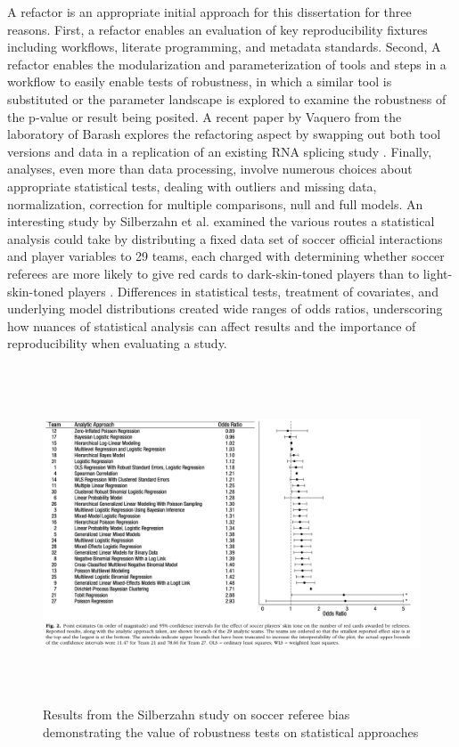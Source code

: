 \documentclass{drexelthesis}
\begin{document}
A refactor is an appropriate initial approach for this dissertation for three reasons. First, a refactor enables an evaluation of key reproducibility fixtures including workflows, literate programming, and metadata standards. Second, A refactor enables the modularization and parameterization of tools and steps in a workflow to easily enable tests of robustness, in which a similar tool is substituted or the parameter landscape is explored to examine the robustness of the p-value or result being posited. A recent paper by Vaquero from the laboratory of Barash explores the refactoring aspect by swapping out both tool versions and data in a replication of an existing RNA splicing study \cite{Vaquero-Garcia2018-ax}. Finally, analyses, even more than data processing, involve numerous choices about appropriate statistical tests, dealing with outliers and missing data, normalization, correction for multiple comparisons, null and full models. An interesting study by Silberzahn et al. examined the various routes a statistical analysis could take by distributing a fixed data set of soccer official interactions and player variables to 29 teams, each charged with determining whether soccer referees are more likely to give red cards to dark-skin-toned players than to light-skin-toned players \cite{Silberzahn2015-yx}. Differences in statistical tests, treatment of covariates, and underlying model distributions created wide ranges of odds ratios, underscoring how nuances of statistical analysis can affect results and the importance of reproducibility when evaluating a study.

\begin{figure}[h!]
	\centering
	\includegraphics[width=16.51cm,height=10.02cm]{./images/soccer.png}
	\caption{Results from the Silberzahn study on soccer referee bias demonstrating the value of robustness tests on statistical approaches}
	\label{soccer}
\end{figure}
\end{document}

